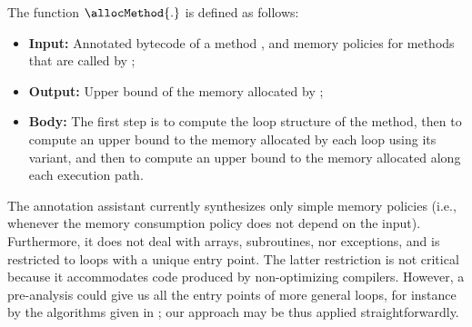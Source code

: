 The function $\allocMethod{.}$ is defined as follows:
\begin{itemize}
\item \textbf{Input:} Annotated bytecode of a method \method, and memory
policies for methods that are called by \method;

\item \textbf{Output:} Upper bound of the memory allocated by \method;

\item \textbf{Body:} The first step is to compute the loop structure
of the method, then to compute an upper bound to the memory allocated
by each loop using its variant, and then to compute an upper bound to
the memory allocated along each execution path.
\end{itemize}

The annotation assistant currently synthesizes only simple memory
policies (i.e., whenever the memory consumption policy does not depend
on the input).  Furthermore, it does not deal with arrays,
subroutines, nor exceptions, and is restricted to loops with a unique
entry point. The latter restriction is not critical because it
accommodates code produced by non-optimizing compilers. However, a
pre-analysis could give us all the entry points of more general loops,
for instance by the algorithms given in \cite{CJPS05cmu}; our approach
may be thus applied straightforwardly. 


